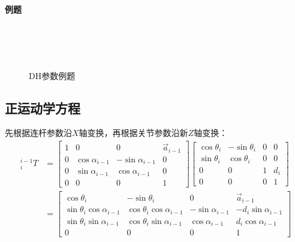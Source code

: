 \documentclass[
12pt, %
a4paper, 
oneside, %
headinclude,footinclude, %
]{scrartcl}
\begin{document}
\paragraph{例题}
\begin{figure}[H]
\centering
\subfloat[例1结构图]{\texttt{[image: 1.1.1]}} \quad
\subfloat[例2结构图]{\texttt{[image: 1.2.1]}} \\
\subfloat[例1参数表]{\texttt{[image: 1.1.2]}} \quad
\subfloat[例2参数表]{\texttt{[image: 1.2.2]}} \\
\subfloat[例3结构图]{\texttt{[image: 1.3.1]}} \quad
\subfloat[例4结构图]{\texttt{[image: 1.4.1]}} \\
\subfloat[例3参数表]{\texttt{[image: 1.3.2]}} \quad
\subfloat[例4参数表]{\texttt{[image: 1.4.2]}}
\caption[DH参数例题]{DH参数例题}
\end{figure}
\subsection[正运动学方程]{正运动学方程}
先根据连杆参数沿$ X $轴变换，再根据关节参数沿新$ Z $轴变换：
\begin{align*}
^{i - 1}_i T &= \begin{bmatrix} 1 & 0 & 0 & \vec a_{i - 1} \\ 0 & \cos \alpha_{i - 1} & -\sin \alpha_{i - 1} & 0 \\ 0 & \sin \alpha_{i - 1} & \cos \alpha_{i - 1} & 0 \\ 0 & 0 & 0 & 1 \end{bmatrix} \begin{bmatrix} \cos \theta_i & -\sin \theta_i & 0 & 0 \\ \sin \theta_i & \cos \theta_i & 0 & 0 \\ 0 & 0 & 1 & d_i \\ 0 & 0 & 0 & 1 \end{bmatrix} \\
&= \begin{bmatrix} \cos\theta_i & -\sin\theta_i & 0 & \vec a_{i-1} \\ \sin\theta_i\cos\alpha_{i-1} & \cos\theta_i\cos\alpha_{i-1} & -\sin\alpha_{i-1} & -d_i\sin\alpha_{i-1} \\ \sin\theta_i\sin\alpha_{i-1} & \cos\theta_i\sin\alpha_{i-1} & \cos\alpha_{i-1} & d_i\cos\alpha_{i-1} \\ 0 & 0 & 0 & 1 \end{bmatrix}
\end{align*}
\end{document}
